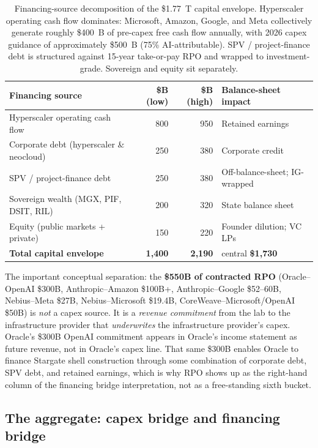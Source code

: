 \documentclass[11pt,a4paper]{article}
\begin{document}
\begin{table}[htbp]
\centering
\small
\begin{tabular}{@{}lrrl@{}}
\toprule
\textbf{Financing source} & \textbf{\$B (low)} & \textbf{\$B (high)} & \textbf{Balance-sheet impact} \\
\midrule
Hyperscaler operating cash flow & 800 & 950 & Retained earnings \\
Corporate debt (hyperscaler \& neocloud) & 250 & 380 & Corporate credit \\
SPV / project-finance debt & 250 & 380 & Off-balance-sheet; IG-wrapped \\
Sovereign wealth (MGX, PIF, DSIT, RIL) & 200 & 320 & State balance sheet \\
Equity (public markets + private) & 150 & 220 & Founder dilution; VC LPs \\
\midrule
\textbf{Total capital envelope} & \textbf{1{,}400} & \textbf{2{,}190} & central \textbf{\$1{,}730} \\
\bottomrule
\end{tabular}
\caption{Financing-source decomposition of the \$1.77~T capital envelope. Hyperscaler operating cash flow dominates: Microsoft, Amazon, Google, and Meta collectively generate roughly \$400~B of pre-capex free cash flow annually, with 2026 capex guidance of approximately \$500~B (75\% AI-attributable). SPV / project-finance debt is structured against 15-year take-or-pay RPO and wrapped to investment-grade. Sovereign and equity sit separately.}
\end{table}

The important conceptual separation: the \textbf{\$550B of contracted RPO} (Oracle--OpenAI \$300B, Anthropic--Amazon \$100B+, Anthropic--Google \$52--60B, Nebius--Meta \$27B, Nebius--Microsoft \$19.4B, CoreWeave--Microsoft/OpenAI \$50B) is \emph{not} a capex source. It is a \emph{revenue commitment} from the lab to the infrastructure provider that \emph{underwrites} the infrastructure provider's capex. Oracle's \$300B OpenAI commitment appears in Oracle's income statement as future revenue, not in Oracle's capex line. That same \$300B enables Oracle to finance Stargate shell construction through some combination of corporate debt, SPV debt, and retained earnings, which is why RPO shows up as the right-hand column of the financing bridge interpretation, not as a free-standing sixth bucket.

\subsection{The aggregate: capex bridge and financing bridge}
\end{document}

